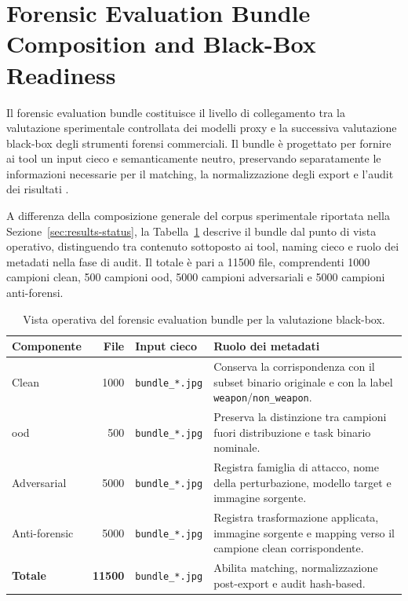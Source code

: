\section{Forensic Evaluation Bundle Composition and Black-Box Readiness}
\label{sec:results-bundle}

Il forensic evaluation bundle costituisce il livello di collegamento tra la
valutazione sperimentale controllata dei modelli proxy e la successiva
valutazione black-box degli strumenti forensi commerciali. Il bundle è progettato
per fornire ai tool un input cieco e semanticamente neutro, preservando
separatamente le informazioni necessarie per il matching, la normalizzazione
degli export e l'audit dei risultati
\cite{casey2011digital,nist2006guide,iso27041,iso27042,swgde2014validation}.

A differenza della composizione generale del corpus sperimentale riportata nella
Sezione~\ref{sec:results-status}, la Tabella~\ref{tab:results-bundle-operational-layout}
descrive il bundle dal punto di vista operativo, distinguendo tra contenuto
sottoposto ai tool, naming cieco e ruolo dei metadati nella fase di audit. Il
totale è pari a 11500 file, comprendenti 1000 campioni clean, 500 campioni
\gls{ood}, 5000 campioni adversariali e 5000 campioni anti-forensi.

\begin{table}[H]
\centering
\scriptsize
\caption{Vista operativa del forensic evaluation bundle per la valutazione black-box.}
\label{tab:results-bundle-operational-layout}
\begin{tabularx}{\textwidth}{@{}l r l X@{}}
\toprule
\textbf{Componente} &
\textbf{File} &
\textbf{Input cieco} &
\textbf{Ruolo dei metadati} \\
\midrule
Clean &
1000 &
\texttt{bundle\_*.jpg} &
Conserva la corrispondenza con il subset binario originale e con la label
\texttt{weapon}/\texttt{non\_weapon}. \\

\gls{ood} &
500 &
\texttt{bundle\_*.jpg} &
Preserva la distinzione tra campioni fuori distribuzione e task binario
nominale. \\

Adversarial &
5000 &
\texttt{bundle\_*.jpg} &
Registra famiglia di attacco, nome della perturbazione, modello target e
immagine sorgente. \\

Anti-forensic &
5000 &
\texttt{bundle\_*.jpg} &
Registra trasformazione applicata, immagine sorgente e mapping verso il
campione clean corrispondente. \\
\midrule
\textbf{Totale} &
\textbf{11500} &
\texttt{bundle\_*.jpg} &
Abilita matching, normalizzazione post-export e audit hash-based. \\
\bottomrule
\end{tabularx}
\end{table}

